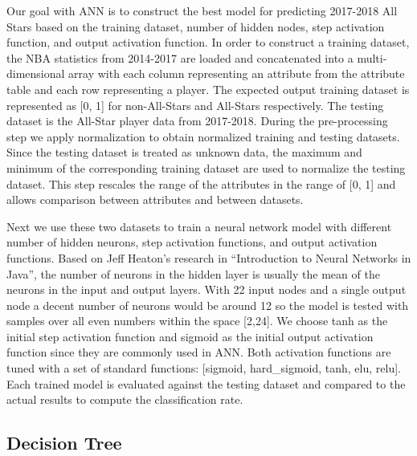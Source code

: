 \documentclass{article}
\begin{document}
Our goal with ANN is to construct the best model for predicting 2017-2018 All Stars based on the training dataset, number of hidden nodes, step activation function, and output activation function. In order to construct a training dataset, the NBA statistics from 2014-2017 are loaded and concatenated into a multi-dimensional array with each column representing an attribute from the attribute table and each row representing a player. The expected output training dataset is represented as [0, 1] for non-All-Stars and All-Stars respectively. The testing dataset is the All-Star player data from 2017-2018. During the pre-processing step we apply normalization to obtain normalized training and testing datasets. Since the testing dataset is treated as unknown data, the maximum and minimum of the corresponding training dataset are used to normalize the testing dataset. This step rescales the range of the attributes in the range of [0, 1] and allows comparison between attributes and between datasets. 

Next we use these two datasets to train a neural network model with different number of hidden neurons, step activation functions, and output activation functions. Based on Jeff Heaton’s research in “Introduction to Neural Networks in Java”, the number of neurons in the hidden layer is usually the mean of the neurons in the input and output layers. With 22 input nodes and a single output node a decent number of neurons would be around 12 so the model is tested with samples over all even numbers within the space [2,24]. We choose tanh as the initial step activation function and sigmoid as the initial output activation function since they are commonly used in ANN. Both activation functions are tuned with a set of standard functions: [sigmoid, hard\_sigmoid, tanh, elu, relu]. Each trained model is evaluated against the testing dataset and compared to the actual results to compute the classification rate.

\subsection{Decision Tree}
\end{document}
